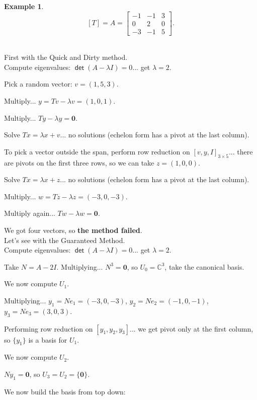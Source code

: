 \documentclass[11pt]{article}
\newcommand{\1}{\mathbf{1}}
\newcommand{\0}{\mathbf{0}}
\newcommand{\C}{\mathbb{C}}
\DeclareMathOperator{\mydet}{\mathsf{det}}
\theoremstyle{definition}
\newtheorem{example}{Example}
\begin{document}
\clearpage

\begin{example}
\[
[T] = A =
\begin{bmatrix}
-1 & -1 & 3 \\
0 & 2 & 0 \\
-3 & -1 & 5
\end{bmatrix}
.
\]
\\
\end{example}

First with the Quick and Dirty method.
\\

Compute eigenvalues: $ \mydet(A-\lambda I)=0 $... get $\lambda=2$.

Pick a random vector: $ v = (1,5,3) $.

Multiply... $y = Tv - \lambda v = (1,0,1)$.

Multiply... $Ty - \lambda y = \0$.

Solve $Tx = \lambda x + v$...
no solutions (echelon form has a pivot at the last column).

To pick a vector outside the span, perform row reduction on $[ v, y, I ]_{3 \times 5}$... there are pivots on the first three rows, so we can take $z=(1,0,0)$.

Solve $Tx = \lambda x + z$...
no solutions (echelon form has a pivot at the last column).

Multiply... $w = Tz - \lambda z = (-3,0,-3)$.

Multiply again... $Tw - \lambda w = \0$.

We got four vectors, so \textbf{the method failed}.
\\

Let's see with the Guaranteed Method.
\\

Compute eigenvalues: $ \mydet(A-\lambda I)=0 $... get $\lambda=2$.

Take $N=A-2I$.
Multiplying... $N^3 = \0$, so $U_0 =\C^3$, take the canonical basis.

We now compute $U_1$.

Multiplying... 
$y_1 = Ne_1 = (-3,0,-3)$,
$y_2 = Ne_2 = (-1,0,-1)$,
$y_3 = Ne_3 = (3,0,3)$.

Performing row reduction on $ [y_1,y_2,y_3] $... we get pivot only at the first column, so $\{y_1\}$ is a basis for $U_1$.

We now compute $U_2$.

$Ny_1 = \0$, so $U_3 = U_2 = \{\0\}$.

We now build the basis from top down:
\end{document}
